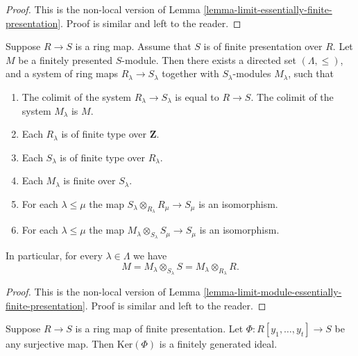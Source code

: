\begin{proof}
This is the non-local version of
Lemma \ref{lemma-limit-essentially-finite-presentation}.
Proof is similar and left to the reader.
\end{proof}

\begin{lemma}
\label{lemma-limit-module-finite-presentation}
Suppose $R \to S$ is a ring map.
Assume that $S$ is of finite presentation over $R$.
Let $M$ be a finitely presented $S$-module.
Then there exists a directed set $(\Lambda, \leq)$, and
a system of ring maps $R_\lambda \to S_\lambda$
together with $S_\lambda$-modules $M_\lambda$,
such that
\begin{enumerate}
\item The colimit of the system $R_\lambda \to S_\lambda$
is equal to $R \to S$. The colimit of the system $M_\lambda$
is $M$.
\item Each $R_\lambda$ is of finite type
over $\mathbf{Z}$.
\item Each $S_\lambda$ is of finite type
over $R_\lambda$.
\item Each $M_\lambda$ is finite over $S_\lambda$.
\item For each $\lambda \leq \mu$ the map
$S_\lambda \otimes_{R_\lambda} R_\mu \to S_\mu$
is an isomorphism.
\item For each $\lambda \leq \mu$ the map
$M_\lambda \otimes_{S_\lambda} S_\mu \to S_\mu$
is an isomorphism.
\end{enumerate}
In particular, for every $\lambda \in \Lambda$ we have
$$
M = M_\lambda \otimes_{S_\lambda} S
= M_\lambda \otimes_{R_\lambda} R.
$$
\end{lemma}

\begin{proof}
This is the non-local version of
Lemma \ref{lemma-limit-module-essentially-finite-presentation}.
Proof is similar and left to the reader.
\end{proof}

\begin{lemma}
\label{lemma-finite-presentation-independent}
Suppose $R \to S$ is a ring map of finite presentation.
Let $\Phi : R[y_1, \ldots, y_t] \to S$ be any surjective map.
Then $\text{Ker}(\Phi)$ is a finitely generated ideal.
\end{lemma}

